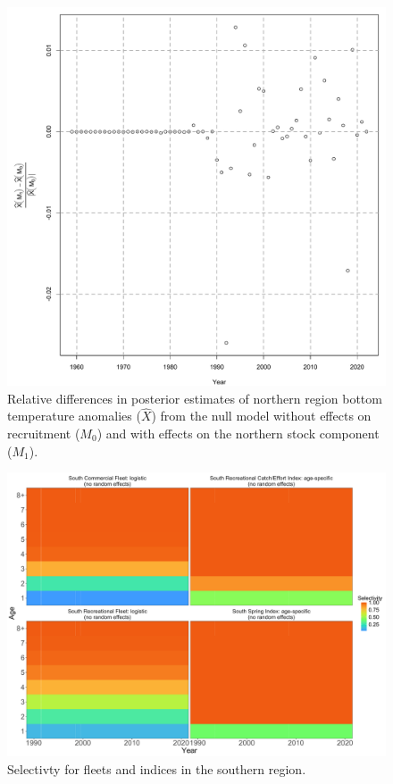 \documentclass[
]{article}
\begin{document}
\begin{figure}

{\centering \includegraphics[height=0.95\textheight]{Ecov_M1_rel_M0} 

}

\caption{Relative differences in posterior estimates of northern region bottom temperature anomalies ($\widehat X$) from the null model without effects on recruitment ($M_0$) and with effects on the northern stock component ($M_1$).}\label{fig:Ecov-M1-rel-M0}
\end{figure}

\begin{figure}

{\centering \includegraphics[height=0.95\textheight]{selectivity_south_plot} 

}

\caption{Selectivty for fleets and indices in the southern region.}\label{fig:selectivity-south}
\end{figure}
\pagebreak
\end{document}
